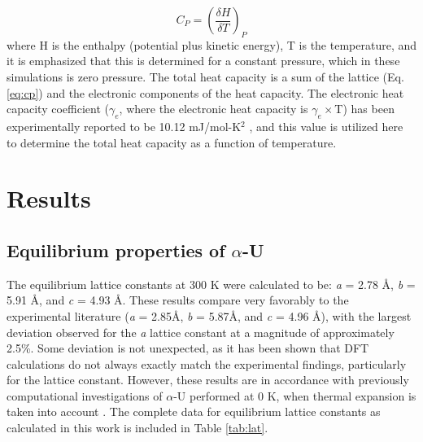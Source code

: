 \documentclass[utf8]{frontiersSCNS} %
\begin{document}
\begin{equation}
\label{eq:cp}
C_{P} = \left(\frac{\delta H}{\delta T}\right)_{P}
\end{equation}where H is the enthalpy (potential plus kinetic energy), T is the temperature, and it is emphasized that this is determined for a constant pressure, which in these simulations is zero pressure. The total heat capacity is a sum of the lattice (Eq. \ref{eq:cp}) and the electronic components of the heat capacity. The electronic heat capacity coefficient ($\gamma_e$, where the electronic heat capacity is $\gamma_e\times$T) has been experimentally reported to be 10.12 mJ/mol-K$^2$ \cite{marchidan1976, schachinger1989} , and this value is utilized here to determine the total heat capacity as a function of temperature. 

\section{Results}

\subsection{Equilibrium properties of $\alpha$-U}

The equilibrium lattice constants at 300 K were calculated to be: \textit{a} = 2.78 \AA, \textit{b} = 5.91 \AA, and \textit{c} = 4.93 \AA. These results compare very favorably to the experimental literature (\textit{a} = 2.85\AA, \textit{b} = 5.87\AA, and \textit{c} = 4.96 \AA \cite{lawson1988}), with the largest deviation observed for the \textit{a} lattice constant at a magnitude of approximately 2.5\%. Some deviation is not unexpected, as it has been shown that DFT calculations do not always exactly match the experimental findings, particularly for the lattice constant. However, these results are in accordance with previously computational investigations of $\alpha$-U performed at 0 K, when thermal expansion is taken into account \cite{wirth2011,beeler2013}. The complete data for equilibrium lattice constants as calculated in this work is included in Table \ref{tab:lat}. 
\end{document}
